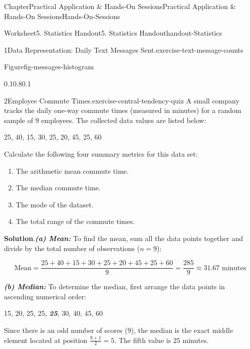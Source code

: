 \documentclass[oneside,10pt,]{book}
\newcommand{\blocktitlefont}{\relax}
\newcommand{\alert}[1]{\textbf{\textit{#1}}}
\begin{document}
\begin{chapterptx}{Chapter}{Practical Application \& Hands-On Sessions}{}{Practical Application \& Hands-On Sessions}{}{}{Hands-On-Sessions}
\begin{worksheet-section}{Worksheet}{5. Statistics Handout}{}{5. Statistics Handout}{}{}{handout-Statistics}
\begin{divisionexercise}{1}{Data Representation: Daily Text Messages Sent.}{}{exercise-text-message-counts}
\begin{figureptx}{Figure}{}{fig-messages-histogram}{}
\begin{image}{0.1}{0.8}{0.1}{}
{%
}%
\end{image}%
\tcblower
\end{figureptx}%
\end{divisionexercise}%
\clearpage
\begin{divisionexercise}{2}{Employee Commute Times.}{}{exercise-central-tendency-quiz}%
A small company tracks the daily one-way commute times (measured in minutes) for a random sample of \(9\) employees. The collected data values are listed below:%
\par
25, 40, 15, 30, 25, 20, 45, 25, 60%
\par
Calculate the following four summary metrics for this data set:%
\begin{enumerate}[label={\alph*}]
\item{}The arithmetic mean commute time.%
\item{}The median commute time.%
\item{}The mode of the dataset.%
\item{}The total range of the commute times.%
\end{enumerate}
%
\par\smallskip%
\noindent\textbf{\blocktitlefont Solution}.\hypertarget{exercise-central-tendency-quiz-3}{}\quad{}\alert{(a) Mean:} To find the mean, sum all the data points together and divide by the total number of observations (\(n = 9\)):%
\par
%
\begin{equation*}
\text{Mean} = \frac{25 + 40 + 15 + 30 + 25 + 20 + 45 + 25 + 60}{9} = \frac{285}{9} \approx 31.67 \text{ minutes}
\end{equation*}
%
\par
\alert{(b) Median:} To determine the median, first arrange the data points in ascending numerical order:%
\par
15, 20, 25, 25, \alert{25}, 30, 40, 45, 60%
\par
Since there is an odd number of scores (\(9\)), the median is the exact middle element located at position \(\frac{9+1}{2} = 5\). The fifth value is \(25\) minutes.%

\end{divisionexercise}
\end{worksheet-section}
\end{chapterptx}
\end{document}
